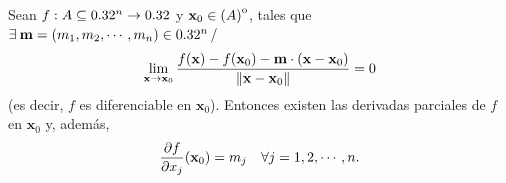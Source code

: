 





\begin{theorem}\label{teo:difDer}Sean $f: A  \subseteq  0.32^n \to 0.32$ y $\mathbf{x}_0 \in {\kern0pt(A)}^{\mathrm{o}}$, tales que $\exists\: \mathbf{m} = (m_1, m_2, \cdots, m_n) \in 0.32^n \, /$
\[
 \lim_{\mathbf{x} \to \mathbf{x}_0} \frac{f(\mathbf{x}) - f(\mathbf{x}_0) - \mathbf{m} \cdot (\mathbf{x} - \mathbf{x}_0)}
                                 {\norm{\mathbf{x} - \mathbf{x}_0}} = 0
\]
(es decir, $f$ es diferenciable en $\mathbf{x}_0$). Entonces existen las derivadas parciales de $f$ en $\mathbf{x}_0$ y, adem\'as,
\[
 \dfrac{\partial f}{\partial x_j} (\mathbf{x}_0) = m_j \quad \forall j = 1, 2, \cdots, n.
\]
\end{theorem}


